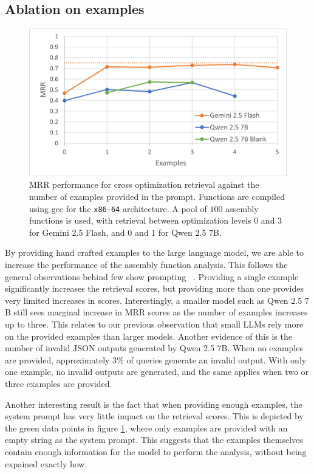 \subsection{Ablation on examples}

\begin{figure}[]
\centerline{\includegraphics[width=\linewidth]{examples-ablation}}
\caption{MRR performance for cross optimization retrieval against the number of examples provided in the prompt. Functions are compiled
using gcc for the \texttt{x86-64} architecture. A pool of \(100\) assembly functions is used, with retrieval between optimization levels \(0\) and \(3\)
for Gemini 2.5 Flash, and \(0\) and \(1\) for Qwen 2.5 \(7\)B.}
\label{ex-abl}
\end{figure}

By providing hand crafted examples to the large language model, we are able to increase the performance of the assembly function analysis.
This follows the general observations behind few show prompting ~\cite{few-shot}. Providing a single example significantly increases the retrieval
scores, but providing more than one provides very limited increases in scores. Interestingly, a smaller model such as Qwen 2.5 \(7\)B still sees
marginal increase in MRR scores as the number of examples increases up to three. This relates to our previous observation
that small LLMs rely more on the provided examples than larger models. Another evidence of this is the number of invalid JSON outputs generated by
Qwen 2.5 \(7\)B. When no examples are provided, approximately \(3\%\) of queries generate an invalid output. With only one example, no invalid
outputs are generated, and the same applies when two or three examples are provided.

Another interesting result is the fact that when providing enough examples, the system prompt has very little impact on the retrieval scores.
This is depicted by the green data points in figure \ref{ex-abl}, where only examples are provided with an empty string as the system prompt.
This suggests that the examples themselves contain enough information for the model to perform the analysis, without being expained 
exactly how.

